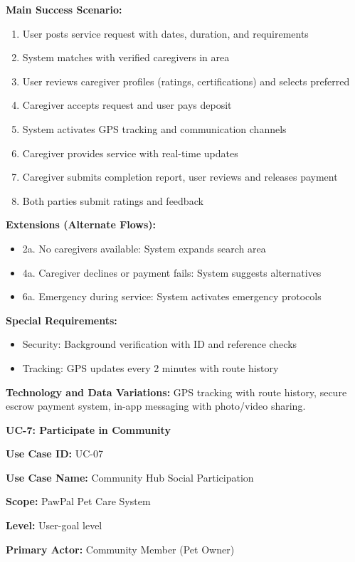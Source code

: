 \textbf{Main Success Scenario:}
\begin{enumerate}
    \item User posts service request with dates, duration, and requirements
    \item System matches with verified caregivers in area
    \item User reviews caregiver profiles (ratings, certifications) and selects preferred
    \item Caregiver accepts request and user pays deposit
    \item System activates GPS tracking and communication channels
    \item Caregiver provides service with real-time updates
    \item Caregiver submits completion report, user reviews and releases payment
    \item Both parties submit ratings and feedback
\end{enumerate}

\textbf{Extensions (Alternate Flows):}
\begin{itemize}
    \item 2a. No caregivers available: System expands search area
    \item 4a. Caregiver declines or payment fails: System suggests alternatives
    \item 6a. Emergency during service: System activates emergency protocols
\end{itemize}

\textbf{Special Requirements:}
\begin{itemize}
    \item Security: Background verification with ID and reference checks
    \item Tracking: GPS updates every 2 minutes with route history
\end{itemize}

\textbf{Technology and Data Variations:} GPS tracking with route history, secure escrow payment system, in-app messaging with photo/video sharing.

\textbf{UC-7: Participate in Community}

\textbf{Use Case ID:} UC-07

\textbf{Use Case Name:} Community Hub Social Participation

\textbf{Scope:} PawPal Pet Care System

\textbf{Level:} User-goal level

\textbf{Primary Actor:} Community Member (Pet Owner)

